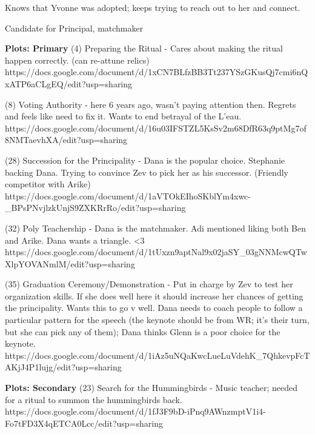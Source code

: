 \documentclass[char]{GL2020}
\begin{document}
Knows that Yvonne was adopted; keeps trying to reach out to her and connect.



Candidate for Principal, matchmaker

\textbf{Plots: Primary}
(4) Preparing the Ritual - Cares about making the ritual happen correctly. (can re-attune relics)
https://docs.google.com/document/d/1xCN7BLfzBB3Tt237YSzGKusQj7cmi6nQxATP6aCLgEQ/edit?usp=sharing

(8) Voting Authority - here 6 years ago, wasn't paying attention then. Regrets and feels like need to fix it.
Wants to end betrayal of the L'eau.
https://docs.google.com/document/d/16u03IFSTZL5KsSv2m68DfR63q9ptMg7of8NMTaevhXA/edit?usp=sharing

(28) Succession for the Principality - Dana is the popular choice. Stephanie backing Dana. Trying to convince Zev to pick her as his successor. (Friendly competitor with Arike)
https://docs.google.com/document/d/1aVTOkEIhoSKblYm4xwc-_BPsPNvjlzkUnjS9ZXKRrRo/edit?usp=sharing

(32) Poly Teachership - Dana is the matchmaker. Adi mentioned liking both Ben and Arike. Dana wants a triangle. <3
https://docs.google.com/document/d/1tUxzn9aptNal9x02jaSY_03gNNMcwQTwXlpYOVANmlM/edit?usp=sharing

(35) Graduation Ceremony/Demonstration - Put in charge by Zev to test her organization skills. If she does well here it should increase her chances of getting the principality. Wants this to go v well. Dana needs to coach people to follow a particular pattern for the speech (the keynote should be from WR; it's their turn, but she can pick any of them); Dana thinks Glenn is a poor choice for the keynote.
https://docs.google.com/document/d/1iAz5uNQaKwcLueLuVdehK_7QhkevpFcTAKjJ4P1lujg/edit?usp=sharing

\textbf{Plots: Secondary}
(23) Search for the Hummingbirds - Music teacher; needed for a ritual to summon the hummingbirds back.
https://docs.google.com/document/d/1fJ3F9bD-iPnq9AWnzmptV1i4-Fo7tFD3X4qETCA0Lcc/edit?usp=sharing	
\end{document}

